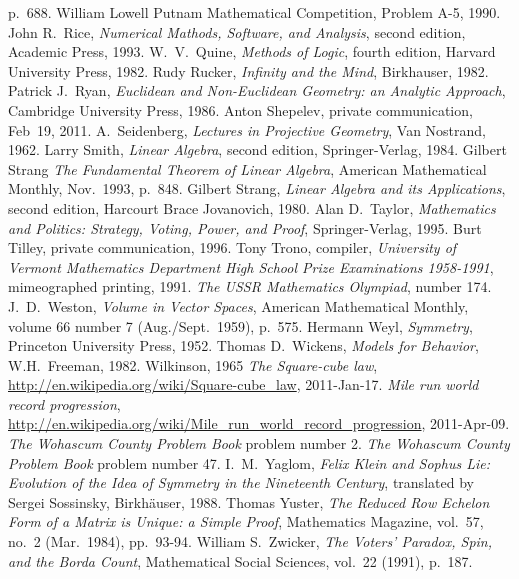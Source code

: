 \begin{thebibliography}{\makebox[2em][c]{{}\hfil{}}}
  p.~688.
  William Lowell Putnam Mathematical Competition,
  Problem A-5, 1990.
  John R.\ Rice,
  \emph{Numerical Mathods, Software, and Analysis},
  second edition,
  Academic Press,
  1993.
  W.\ V.\ Quine,
  \emph{Methods of Logic},
  fourth edition,
  Harvard University Press,
  1982.
  Rudy Rucker,
  \emph{Infinity and the Mind},
  Birkhauser,
  1982.
  Patrick J.~Ryan,
  \emph{Euclidean and Non-Euclidean Geometry: an Analytic Approach},
  Cambridge University Press, 1986.
  Anton Shepelev,
  private communication,
  Feb~19, 2011.
  A.~Seidenberg,
  \emph{Lectures in Projective Geometry},
  Van Nostrand, 1962.
  Larry Smith,
  \emph{Linear Algebra},
  second edition,
  Springer-Verlag,
  1984.
  Gilbert Strang
  \emph{The Fundamental Theorem of Linear Algebra},
  American Mathematical Monthly,
  Nov.~1993, p.~848.
  Gilbert Strang,
  \emph{Linear Algebra and its Applications},
  second edition,
  Harcourt Brace Jovanovich,
  1980.
  Alan D.~Taylor,
  \emph{Mathematics and Politics: Strategy, Voting, Power, and Proof},
  Springer-Verlag,
  1995.
  Burt Tilley,
  private communication,
  1996.
  Tony Trono, compiler,
  \emph{University of Vermont Mathematics Department High School Prize
    Examinations 1958-1991},
  mimeographed printing, 1991.
  \emph{The USSR Mathematics Olympiad},
   number 174.
  J.~D.\ Weston,
  \emph{Volume in Vector Spaces},
  American Mathematical Monthly,
  volume 66 number 7 (Aug./Sept.\ 1959),
  p.~575.
  Hermann Weyl,
  \emph{Symmetry},
  Princeton University Press,
  1952.
  Thomas D.~Wickens,
  \emph{Models for Behavior},
  W.H.~Freeman,
  1982.
  Wilkinson,
  1965
  \emph{The Square-cube law},
  \url{http://en.wikipedia.org/wiki/Square-cube_law},
  2011-Jan-17.
  \emph{Mile run world record progression},
  \url{http://en.wikipedia.org/wiki/Mile_run_world_record_progression},
  2011-Apr-09.
  \emph{The Wohascum County Problem Book}
  problem number 2.
  \emph{The Wohascum County Problem Book}
  problem number 47.
  I.\ M.~Yaglom,
  \emph{Felix Klein and Sophus Lie: Evolution of the Idea of
   Symmetry in the Nineteenth Century},
  translated by Sergei Sossinsky,
  Birkh\"auser,
  1988.
  Thomas Yuster,
  \emph{The Reduced Row Echelon Form of a Matrix is Unique: a Simple Proof},
  Mathematics Magazine,
  vol.~57, no.~2 (Mar.~1984),
  pp.~93-94.
  William S.~Zwicker,
  \emph{The Voters' Paradox, Spin, and the Borda Count},
  Mathematical Social Sciences,
  vol.~22 (1991),
  p.~187. 
\end{thebibliography}
